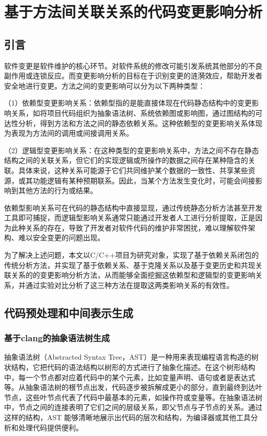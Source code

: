 
\chapter{基于方法间关联关系的代码变更影响分析}

\section{引言}

软件变更是软件维护的核心环节。对软件系统的修改可能引发系统其他部分的不良副作用或连锁反应。而变更影响分析的目标在于识别变更的涟漪效应，帮助开发者安全地进行变更。方法之间的变更影响可以分为以下两种类型：

（1）依赖型变更影响关系：依赖型指的是能直接体现在代码静态结构中的变更影响关系，如将项目代码组织为抽象语法树、系统依赖图或影响图，通过图结构的可达性分析，得到方法和方法之间的静态依赖关系。这种依赖型的变更影响关系体现为表现为方法间的调用或间接调用关系。

（2）逻辑型变更影响关系：在这种类型的变更影响关系中，方法之间不存在静态结构之间的关联关系，但它们的实现逻辑或所操作的数据之间存在某种隐含的关联。具体来说，这种关系可能源于它们共同维护某个数据的一致性、共享某些资源，或其功能逻辑有某种预期联系。因此，当某个方法发生变化时，可能会间接影响到其他方法的行为或结果。

依赖型影响关系可在代码的静态结构中直接显现，通过传统静态分析方法甚至开发工具即可捕捉，而逻辑型影响关系通常只能通过开发者人工进行分析提取，正是因为此种关系的存在，导致了开发者对软件代码的维护非常困扰，难以理解软件架构、难以安全变更的问题出现。

为了解决上述问题，本文以C/C++项目为研究对象，实现了基于依赖关系闭包的传统分析方法，并实现了基于依赖关系、基于克隆关系以及基于变更历史和共现关联关系的的变更影响分析方法，从而能够全面挖掘这依赖型和逻辑型的变更影响关系，并通过实验对比分析了这三种方法在提取这两类影响关系的有效性。


\section{代码预处理和中间表示生成}


\subsection{基于clang的抽象语法树生成}
抽象语法树（Abstracted Syntax Tree，AST）是一种用来表现编程语言构造的树状结构，它把代码的语法结构以树形的方式进行了抽象化描述。在这个树形结构中，每一个节点都对应着代码中的某个元素，比如变量声明、语句或者是表达式等。从抽象语法树的根节点出发，代码逐步被拆解成更小的部分，直到最终到达叶节点，这些叶节点代表了代码中最基本的元素，如操作符或变量等。在抽象语法树中，节点之间的连接表明了它们之间的层级关系，即父节点与子节点的关系。通过这样的结构，AST 能够清晰地展示出代码的层次和结构，为编译器或其他工具分析和处理代码提供便利。



